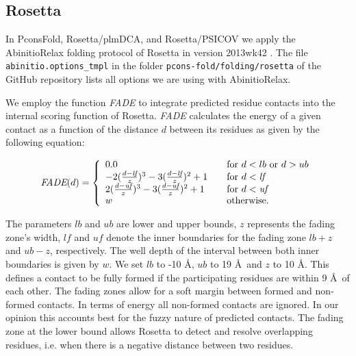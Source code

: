 \documentclass{bioinfo}
\begin{document}
\begin{methods}
\subsection{Rosetta}
In PconsFold, Rosetta/plmDCA, and Rosetta/PSICOV we apply the
AbinitioRelax folding protocol \cite[]{rohl_protein_2004} of Rosetta
in version 2013wk42 \cite[]{leaver-fay_rosetta3:_2011}. The file {\tt
 abinitio.options\_tmpl} in the folder {\tt pcons-fold/folding/rosetta} of the GitHub
repository lists all options we are using with AbinitioRelax. 

We employ the function \emph{FADE} to integrate predicted residue
contacts into the internal scoring function of Rosetta. \emph{FADE}
calculates the energy of a given contact as a function of the distance
$d$ between its residues as given by the following equation:

\begin{equation}%
\textit{FADE}(d) = \left\{
\begin{array}{l l l}\label{eq:fade}
0.0 & \quad \textrm{for $d < lb$ or $d > ub$} \\
-2(\frac{d - \textit{lf}}{z})^3 - 3(\frac{d - \textit{lf}}{z})^2 + 1 & \quad \textrm{for $d < \textit{lf}$} \\
2(\frac{d - \textit{uf}}{z})^3 - 3(\frac{d - \textit{uf}}{z})^2 + 1 & \quad \textrm{for $d < \textit{uf}$} \\
w & \quad \textrm{otherwise.} \\
\end{array} \right.
\end{equation}

The parameters $lb$ and $ub$ are lower and upper bounds, $z$
represents the fading zone's width, $\textit{lf}$ and $\textit{uf}$
denote the inner boundaries for the fading zone $lb + z$ and $ub - z$,
respectively. The well depth of the interval between both inner
boundaries is given by $w$. We set $lb$ to -10 \AA, $ub$ to 19 \AA\
and $z$ to 10 \AA. This defines a contact to be fully formed if the
participating residues are within 9 \AA\ of each other. The fading
zones allow for a soft margin between formed and non-formed
contacts. In terms of energy all non-formed contacts are ignored. In
our opinion this accounts best for the fuzzy nature of predicted
contacts. The fading zone at the lower bound allows Rosetta to detect
and resolve overlapping residues, i.e. when there is a negative
distance between two residues. 



\end{methods}
\end{document}
